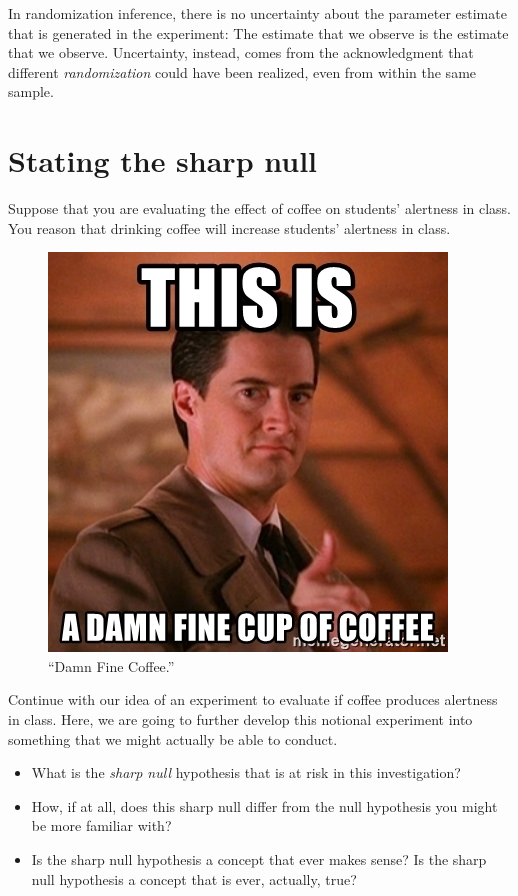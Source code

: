 \documentclass[
]{book}
\providecommand{\tightlist}{%
  \setlength{\itemsep}{0pt}\setlength{\parskip}{0pt}}
\begin{document}
In randomization inference, there is no uncertainty about the parameter
estimate that is generated in the experiment: The estimate that we
observe is the estimate that we observe. Uncertainty, instead, comes
from the acknowledgment that different \emph{randomization} could have
been realized, even from within the same sample.

\hypertarget{stating-the-sharp-null}{%
\section{Stating the sharp null}\label{stating-the-sharp-null}}

Suppose that you are evaluating the effect of coffee on students'
alertness in class. You reason that drinking coffee will increase
students' alertness in class.

\begin{figure}
\centering
\includegraphics{./images/damn-fine-coffee.jpeg}
\caption{``Damn Fine Coffee.''}
\end{figure}

Continue with our idea of an experiment to evaluate if coffee produces
alertness in class. Here, we are going to further develop this notional
experiment into something that we might actually be able to conduct.

\begin{itemize}
\tightlist
\item
  What is the \emph{sharp null} hypothesis that is at risk in this
  investigation?
\item
  How, if at all, does this sharp null differ from the null hypothesis
  you might be more familiar with?
\item
  Is the sharp null hypothesis a concept that ever makes sense? Is the
  sharp null hypothesis a concept that is ever, actually, true?
\end{itemize}
\end{document}
